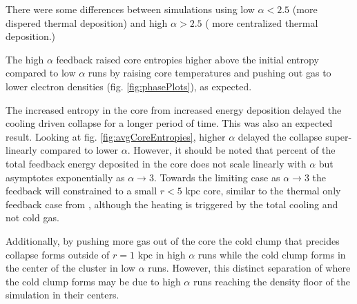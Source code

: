 \documentclass[iop,apjl, twocolappendix]{emulateapj}   %
\def\FG#1{{\textcolor{ForestGreen}{\textbf{\textit{ FG: #1}}}}}
\begin{document}
There were some differences between simulations using low $\alpha<2.5$ (more
dispered thermal deposition) and high $\alpha>2.5$ ( more centralized thermal
deposition.) 

The high $\alpha$ feedback raised core entropies higher above the
initial entropy compared to low $\alpha$ runs by raising core temperatures and
pushing out gas to lower electron densities (fig. \ref{fig:phasePlots}), as
expected. 

The increased entropy in the core from increased energy deposition delayed the
cooling driven collapse for a longer period of time. This was also an expected
result. Looking at fig. \ref{fig:avgCoreEntropies}, higher $\alpha$ delayed the
collapse super-linearly compared to lower $\alpha$. However, it should be noted
that percent of the total feedback energy deposited in the core does not scale
linearly with $\alpha$ but asymptotes exponentially as $\alpha \rightarrow 3$.
Towards the limiting case as $\alpha \rightarrow 3$ the feedback will
constrained to a small $r < 5 \text{ kpc}$ core, similar to the thermal only
feedback case from \cite{meece_triggering_2017}, although the heating is
triggered by the total cooling and not cold gas.

Additionally, by pushing more gas out of the core the cold clump that precides
collapse forms outside of $r=1 \text{ kpc}$ in high $\alpha$ runs while the
cold clump forms in the center of the cluster in low $\alpha$ runs. However,
this distinct separation of where the cold clump forms may be due to high
$\alpha$ runs reaching the density floor of the simulation in their centers.

\end{document}
